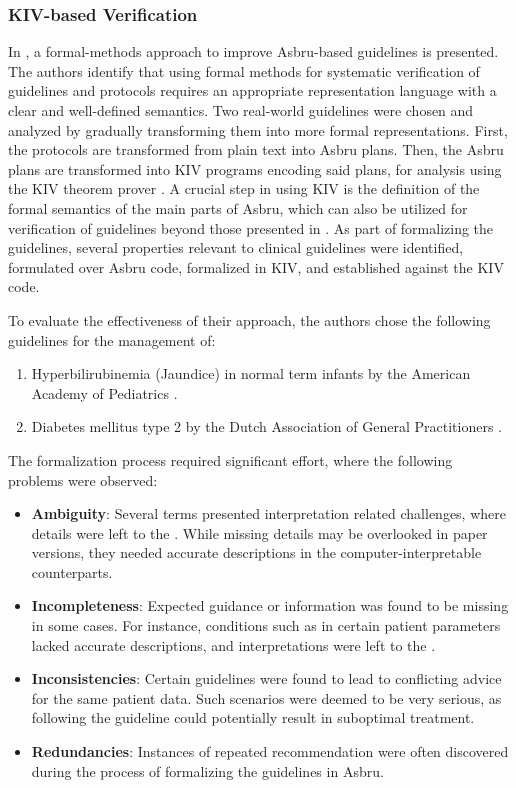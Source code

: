 \subsubsection{KIV-based Verification}\label{sec:kiv-verification}

In \cite{TenAIM06}, a formal-methods approach to improve Asbru-based guidelines
is presented. The authors identify that using formal methods
for systematic verification of guidelines and protocols requires
an appropriate representation language with a clear and well-defined semantics.
Two real-world guidelines were chosen and analyzed
by gradually transforming them into more formal representations.
First, the protocols are transformed from plain text into Asbru plans. Then,
the Asbru plans are transformed into KIV programs encoding said plans, for analysis
using the KIV theorem prover \cite{BalserFASE00}. A crucial step in using
KIV is the definition of the formal semantics of the main parts of Asbru,
which can also be utilized for verification of guidelines beyond those
presented in \cite{TenAIM06}. As part of formalizing the guidelines,
several properties relevant to clinical guidelines were identified,
formulated over Asbru code, formalized in KIV, and established against
the KIV code.

To evaluate the effectiveness of their approach, the authors chose the following
guidelines for the management of:
\begin{enumerate}[label=(\alph*)]
  \item Hyperbilirubinemia (Jaundice) in normal term infants by the American
    Academy of Pediatrics \cite{JaundiceAAP94}.
  \item Diabetes mellitus type 2 by the Dutch Association of General
    Practitioners \cite{RuttenNHG99}.
\end{enumerate}
The formalization process required significant effort, where the
following problems were observed:
\begin{itemize}
  \item \textbf{Ambiguity}: Several terms presented interpretation
    related challenges, where details were left to the \HCP{}. While
    missing details may be overlooked in paper versions, they needed
    accurate descriptions in the computer-interpretable counterparts.
  \item \textbf{Incompleteness}: Expected guidance or information
    was found to be missing in some cases. For instance, conditions
    such as  in certain patient parameters lacked
    accurate descriptions, and interpretations were left to the \HCPs{}.
  \item \textbf{Inconsistencies}: Certain guidelines were found to lead
    to conflicting advice for the same patient data. Such scenarios
    were deemed to be very serious, as following the guideline could
    potentially result in suboptimal treatment.
  \item \textbf{Redundancies}: Instances of repeated recommendation were
    often discovered during the process of formalizing the guidelines in Asbru.
\end{itemize}


